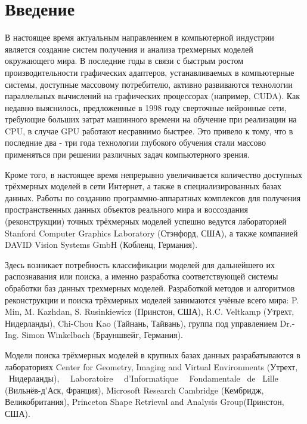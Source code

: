 \documentclass[14pt]{article}
\numberwithin{figure}{section}
\numberwithin{equation}{section}
\begin{document}
\newpage
\tableofcontents

\newpage

\section*{Введение}

В настоящее время актуальным направлением в компьютерной индустрии является создание систем получения и анализа трехмерных моделей окружающего мира. В последние годы в связи с быстрым ростом производительности графических адаптеров, устанавливаемых в компьютерные системы, доступные массовому потребителю, активно развиваются технологии параллельных вычислений на графических процессорах (например, CUDA). Как недавно выяснилось, предложенные в 1998 году сверточные нейронные сети, требующие больших затрат машинного времени на обучение при реализации на CPU, в случае GPU работают несравнимо быстрее. Это привело к тому, что в последние два - три года технологии глубокого обучения стали массово применяться при решении различных задач компьютерного зрения.

Кроме того, в настоящее время непрерывно увеличивается количество доступных трёхмерных моделей в сети Интернет, а также в специализированных базах данных. %
Работы по созданию программно-аппаратных комплексов для получения пространственных данных объектов реального мира и воссоздания (реконструкции) точных трёхмерных моделей успешно ведутся лабораторией Stanford Computer Graphics Laboratory (Стэнфорд, США), а также компанией DAVID Vision Systems GmbH (Кобленц, Германия). %

Здесь возникает потребность классификации моделей для дальнейшего их распознавания или поиска, а именно разработка соответствующей системы обработки баз данных трехмерных моделей. %
Разработкой методов и алгоритмов реконструкции и поиска трёхмерных моделей занимаются учёные всего мира: P. Min, M. Kazhdan, S. Rusinkiewicz (Принстон, США), R.C. Veltkamp (Утрехт, Нидерланды), Chi-Chou Kao (Тайнань, Тайвань), группа под управлением Dr.-Ing. Simon Winkelbach (Брауншвейг, Германия).

Модели поиска трёхмерных моделей в крупных базах данных разрабатываются в лабораториях Center for Geometry, Imaging and Virtual Environments (Утрехт, \ Нидерланды), \ \ Laboratoire \ \  d'Informatique \ \ Fondamentale \ de \ Lille\\(Вильнёв-д’Аск, Франция), Microsoft Research Cambridge (Кембридж, Великобритания), Princeton Shape Retrieval and Analysis Group(Принстон, США).%
\end{document}
